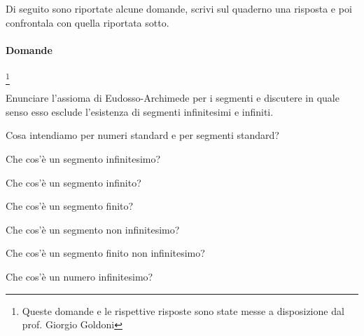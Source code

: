 
\subsubsection*{}

Di seguito sono riportate alcune domande, scrivi sul quaderno una risposta e 
poi confrontala con quella riportata sotto.

\paragraph{Domande}
\footnote{Queste domande e le rispettive risposte sono state messe a 
disposizione dal prof. Giorgio Goldoni}

\begin{multicols}{2}

\begin{esercizio}\label{ese:iper_001}
Enunciare l'assioma di Eudosso-Archimede per i 
segmenti e discutere in quale
senso esso esclude l'esistenza di segmenti infinitesimi e infiniti.
\end{esercizio}

\begin{esercizio}\label{ese:iper_002}
Cosa intendiamo per numeri standard e per segmenti standard?
\end{esercizio}

\begin{esercizio}\label{ese:iper_003}
Che cos'è un segmento infinitesimo?
\end{esercizio}

\begin{esercizio}\label{ese:iper_004}
Che cos'è un segmento infinito?
\end{esercizio}

\begin{esercizio}\label{ese:iper_005}
Che cos'è un segmento finito?
\end{esercizio}

\begin{esercizio}\label{ese:iper_006}
Che cos'è un segmento non infinitesimo?
\end{esercizio}

\begin{esercizio}\label{ese:iper_007}
Che cos'è un segmento finito non infinitesimo?
\end{esercizio}

\begin{esercizio}\label{ese:iper_008}
Che cos'è un numero infinitesimo?
\end{esercizio}


\end{multicols}

